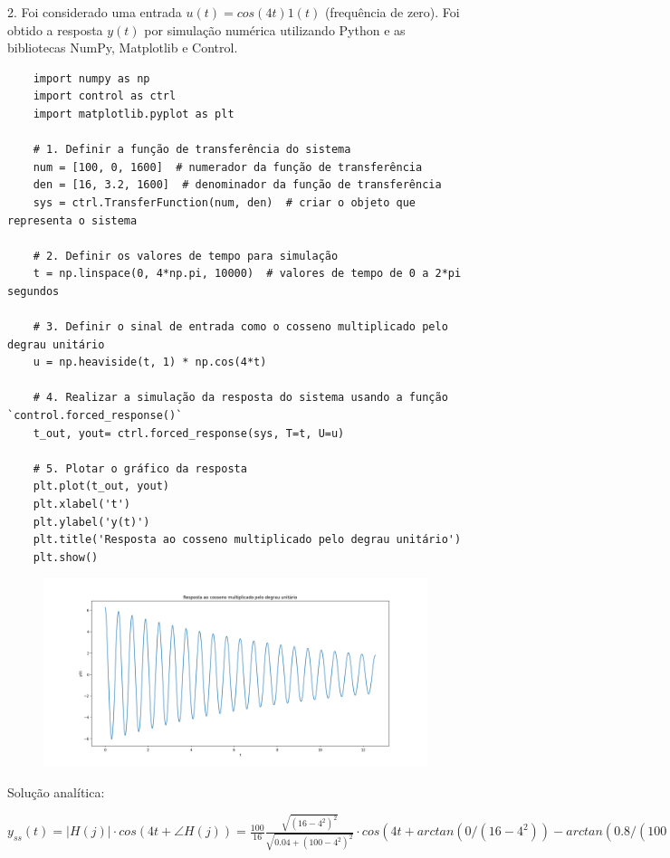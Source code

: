 \documentclass[10pt]{article}
\begin{document}
2. Foi considerado uma entrada $u(t) = cos(4 t) 1(t)$ (frequência de zero). Foi obtido a resposta $y(t)$ por simulação numérica utilizando Python
e as bibliotecas NumPy, Matplotlib e Control.

\begin{verbatim}
    import numpy as np
    import control as ctrl
    import matplotlib.pyplot as plt

    # 1. Definir a função de transferência do sistema
    num = [100, 0, 1600]  # numerador da função de transferência
    den = [16, 3.2, 1600]  # denominador da função de transferência
    sys = ctrl.TransferFunction(num, den)  # criar o objeto que representa o sistema

    # 2. Definir os valores de tempo para simulação
    t = np.linspace(0, 4*np.pi, 10000)  # valores de tempo de 0 a 2*pi segundos

    # 3. Definir o sinal de entrada como o cosseno multiplicado pelo degrau unitário
    u = np.heaviside(t, 1) * np.cos(4*t)

    # 4. Realizar a simulação da resposta do sistema usando a função `control.forced_response()`
    t_out, yout= ctrl.forced_response(sys, T=t, U=u)

    # 5. Plotar o gráfico da resposta
    plt.plot(t_out, yout)
    plt.xlabel('t')
    plt.ylabel('y(t)')
    plt.title('Resposta ao cosseno multiplicado pelo degrau unitário')
    plt.show()
\end{verbatim}

\begin{figure}[h]
    \includegraphics[scale=0.4]{questao2.png}
    \centering
\end{figure}

Solução analítica:

$y_{ss}(t) = |H(j)| \cdot cos(4 t + \angle H(j)) = \frac{100}{16} \frac{\sqrt{(16-4^2)^2}}{\sqrt{0.04 + (100 - 4^2)^2}} \cdot cos(4 t + arctan(0/(16 - 4^2)) - arctan(0.8/(100 - 4^2))) =$
\end{document}
